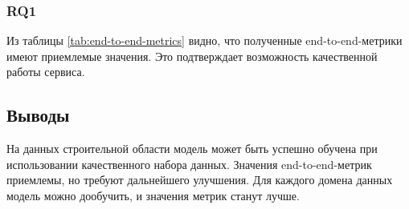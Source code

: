 \subsubsection{RQ1}

Из таблицы \ref{tab:end-to-end-metrics} видно, что полученные end-to-end-метрики имеют приемлемые значения.
Это подтверждает возможность качественной работы сервиса.

\subsection{Выводы}

На данных строительной области модель может быть успешно обучена при использовании качественного набора данных.
Значения end-to-end-метрик приемлемы, но требуют дальнейшего улучшения. Для каждого домена данных модель можно дообучить,
и значения метрик станут лучше.

